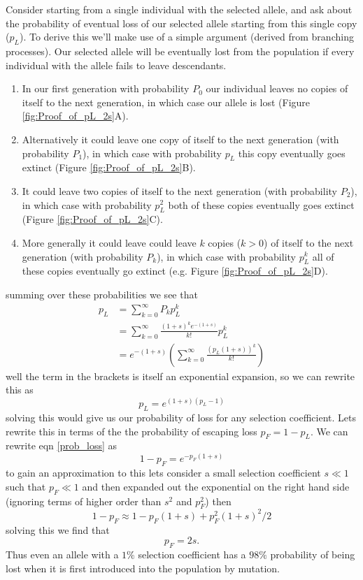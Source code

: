Consider starting from a single individual with the selected allele, and ask
about the probability of eventual loss of our selected allele starting
from this single copy ($p_L$). To derive this we'll make use of a
simple argument (derived from branching processes). Our selected
allele will be eventually lost from the population if every individual
with the allele fails to leave descendants.
\begin{enumerate}
\item In our first generation
with probability $P_0$ our individual leaves no copies of itself to
the next generation, in which case our allele is lost (Figure \ref{fig:Proof_of_pL_2s}A).
\item Alternatively
it could leave one copy of itself to the next generation (with
probability $P_1$), in which
case with probability $p_L$ this copy eventually goes extinct (Figure \ref{fig:Proof_of_pL_2s}B).
\item It could leave two copies of itself to the next generation (with
probability $P_2$), in which
case with probability $p_L^2$ both of these copies eventually goes
extinct (Figure \ref{fig:Proof_of_pL_2s}C).
\item More generally it could leave could leave $k$ copies ($k>0$) of itself to the next generation (with
probability $P_k$), in which case with probability $p_L^k$  all of
these copies eventually go extinct (e.g. Figure \ref{fig:Proof_of_pL_2s}D).
\end{enumerate}
summing over these probabilities we see that
\begin{eqnarray}
p_L &= \sum_{k=0}^{\infty} P_k p_L^{k}  \nonumber \\
&=  \sum_{k=0}^{\infty} \frac{(1+s)^ke^{-(1+s)}}{k!} p_L^{k} \nonumber
\\
&= e^{-(1+s)} \left( \sum_{k=0}^{\infty} \frac{\left(p_L(1+s) \right)^k}{k!}  \right)
\end{eqnarray}
well the term in the brackets is itself an exponential expansion, so
we can rewrite this as
\begin{equation}
p_L = e^{(1+s)(p_L-1)} \label{prob_loss}
\end{equation}
solving this would give us our probability of loss for any selection
coefficient. Lets
rewrite this in terms of the the probability of escaping loss $p_F = 1-p_L$.  We can
rewrite eqn \eqref{prob_loss} as
\begin{equation}
1-p_F = e^{-p_F(1+s)}
\end{equation}
to gain an approximation to this lets consider a small selection
coefficient $s \ll 1$ such that $p_F \ll 1$ and then expanded out the
exponential on the right hand side (ignoring terms of higher
order than $s^2$ and $p_F^2$) then
\begin{equation}
1-p_F \approx 1-p_F(1+s)+p_F^2(1+s)^2/2
\end{equation}
solving this we find that
\begin{equation}
p_F = 2s.
\end{equation}
Thus even an allele with a $1\%$ selection coefficient has a $98\%$
probability of being lost when it is first introduced into the
population by mutation.\\

